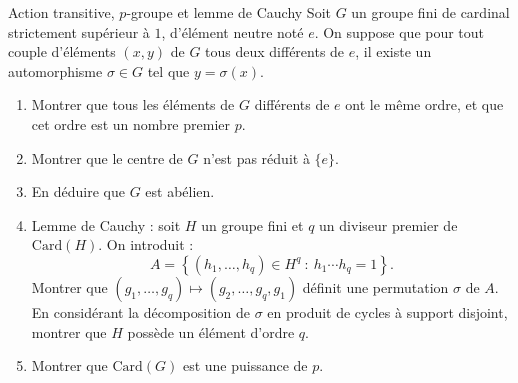 \documentclass[french]{book}
\newcommand{\card}{\text{Card}}
\theoremstyle{definition}
\theoremstyle{remark}
\begin{document}
\begin{exo}[3]{Action transitive, $p$-groupe et lemme de Cauchy}
	Soit $G$ un groupe fini de cardinal strictement supérieur à $1$, d'élément neutre noté $e$. On suppose que pour tout couple d'éléments $(x,y)$ de $G$ tous deux différents de $e$, il existe un automorphisme $\sigma\in G$ tel que $y=\sigma(x)$.
	\begin{enumerate}
		\item Montrer que tous les éléments de $G$ différents de $e$ ont le même ordre, et que cet ordre est un nombre premier $p$.
		\item Montrer que le centre de $G$ n'est pas réduit à $\{e\}$.
		\item En déduire que $G$ est abélien.
		\item Lemme de Cauchy : soit $H$ un groupe fini et $q$ un diviseur premier de $\card(H)$. On introduit : $$A=\left\{(h_1,\ldots,h_q)\in H^q\ : \ h_1\cdots h_q=1\right\}.$$ Montrer que $(g_1,\ldots,g_q)\mapsto(g_2,\ldots,g_q,g_1)$ définit une permutation $\sigma$ de $A$. En considérant la décomposition de $\sigma$ en produit de cycles à support disjoint, montrer que $H$ possède un élément d'ordre $q$.
		\item Montrer que $\card(G)$ est une puissance de $p$.
	\end{enumerate}
\end{exo}
\end{document}
